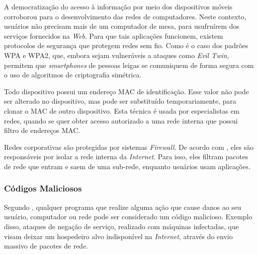     \vspace{4mm}
    
    \hspace{1cm}
    A democratização do acesso à informação por meio dos dispositivos móveis corroborou para o desenvolvimento das redes de computadores. Neste contexto, usuários não precisam mais de um computador de mesa, para usufruírem dos serviços fornecidos na \textit{Web}. Para que tais aplicações funcionem, existem protocolos de segurança que protegem redes sem fio. Como é o caso dos padrões WPA e WPA2, que, embora sejam vulneráveis a ataques como \textit{Evil Twin}, permitem que \textit{smartphones} de pessoas leigas se comuniquem de forma segura com o uso de algoritmos de criptografia simétrica.
    
    \vspace{4mm}
    
    \hspace{1cm}
    Todo dispositivo possui um endereço MAC de identificação. Esse valor não pode ser alterado no dispositivo, mas pode ser substituído temporariamente, para clonar o MAC de outro dispositivo. Esta técnica é usada por especialistas em redes, quando se quer obter acesso autorizado a uma rede interna que possui filtro de endereços MAC.
    
    \vspace{4mm}
    
    \hspace{1cm}
    Redes corporativas são protegidas por sistemas \textit{Firewall}. De acordo com , eles são responsáveis por isolar a rede interna da \textit{Internet}. Para isso, eles filtram pacotes de rede que entram e saem de uma sub-rede, enquanto usuários usam aplicações.

    \subsubsection{Códigos Maliciosos} \label{cap1_visao_geral_malware}

    \hspace{1cm}
    Segundo , qualquer programa que realize alguma ação que cause danos ao seu usuário, computador ou rede pode ser considerado um código malicioso. Exemplo disso, ataques de negação de serviço, realizado com máquinas infectadas, que visam deixar um hospedeiro alvo indisponível na \textit{Internet}, através do envio massivo de pacotes de rede. 
    
    \vspace{4mm}
    
